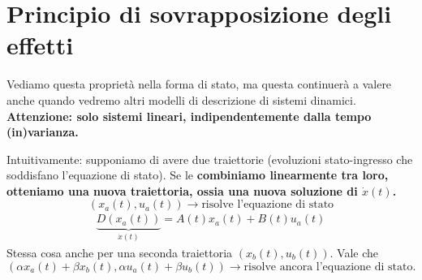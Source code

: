 \documentclass[a4paper]{report}
\begin{document}
\section{Principio di sovrapposizione degli effetti}


\begin{defin}{}{}
	Vediamo questa proprietà nella forma di stato, ma questa continuerà a valere anche quando vedremo altri modelli di descrizione di sistemi dinamici.
	\bb \textbf{Attenzione: solo sistemi lineari, indipendentemente dalla tempo (in)varianza.}
	
	\bb
	Intuitivamente: supponiamo di avere due traiettorie (evoluzioni stato-ingresso che soddisfano l'equazione di stato). Se le \textbf{combiniamo linearmente tra loro, otteniamo una nuova traiettoria, ossia una nuova soluzione di $\dot x(t)$.}
	\bb
	\begin{equation*}
		(x_a(t), u_a(t)) \rightarrow \textrm{risolve l'equazione di stato}
	\end{equation*}
	\begin{align*}
		\underbrace{D(x_a(t))}_{\dot x(t)} = A(t)x_a(t)+B(t)u_a(t)
	\end{align*}
	Stessa cosa anche per una seconda traiettoria $(x_b(t), u_b(t)).$
	Vale che 
	\begin{equation*}
		(\alpha x_a(t)+\beta x_b(t), \alpha u_a(t) + \beta u_b(t)) \rightarrow \textrm{risolve ancora l'equazione di stato.}
	\end{equation*}
\end{defin}
\end{document}
